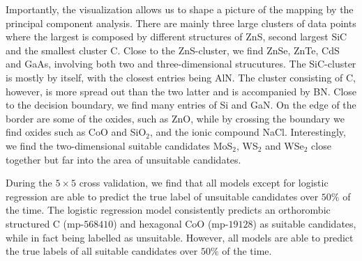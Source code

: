Importantly, the visualization allows us to shape a picture of the mapping by the principal component analysis. There are mainly three large clusters of data points where the largest is composed by different structures of ZnS, second largest SiC and the smallest cluster C. %
Close to the ZnS-cluster, we find ZnSe, ZnTe, CdS and GaAs, involving both two and three-dimensional strucutures.
The SiC-cluster is mostly by itself, with the closest entries being AlN. The cluster consisting of C, however, is more spread out than the two latter and is accompanied by BN. Close to the decision boundary, we find many entries of Si and GaN. On the edge of the border are some of the oxides, such as ZnO, while by crossing the boundary we find oxides such as CoO and SiO$_2$, and the ionic compound NaCl. Interestingly, we find the two-dimensional suitable candidates MoS$_2$, WS$_2$ and WSe$_2$ close together but far into the area of unsuitable candidates.

During the $5\times 5$ cross validation, we find that all models except for logistic regression are able to predict the true label of unsuitable candidates over $50 \%$ of the time.
The logistic regression model consistently predicts an orthorombic structured C (mp-$568410$) and hexagonal CoO (mp-$19128$) as suitable candidates, while in fact being labelled as unsuitable. However, all models are able to predict the true labels of all suitable candidates over $50\%$ of the time.


